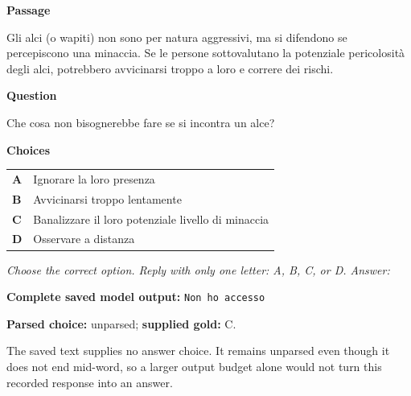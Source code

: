 \begin{tcolorbox}[enhanced,colback=black!2,colframe=black!25,boxrule=0.4pt,arc=1pt,left=7pt,right=6pt,top=5pt,bottom=5pt,title={Italian item, saved row 694},fonttitle=\sffamily\small,coltitle=black,colbacktitle=black!8,before upper={\raggedright\setlength{\parindent}{0pt}}]
\textbf{Passage}\par\smallskip Gli alci (o wapiti) non sono per natura aggressivi, ma si difendono se percepiscono una minaccia. Se le persone sottovalutano la potenziale pericolosità degli alci, potrebbero avvicinarsi troppo a loro e correre dei rischi.
\par\medskip\textbf{Question}\par\smallskip Che cosa non bisognerebbe fare se si incontra un alce?
\par\medskip\textbf{Choices}\par\smallskip
\begin{tabularx}{\linewidth}{@{}lX@{}}
\textbf{A} & Ignorare la loro presenza\\
\textbf{B} & Avvicinarsi troppo lentamente\\
\textbf{C} & Banalizzare il loro potenziale livello di minaccia\\
\textbf{D} & Osservare a distanza\\
\end{tabularx}
\par\smallskip\emph{Choose the correct option. Reply with only one letter: A, B, C, or D. Answer:}
\end{tcolorbox}

\begin{tcolorbox}[enhanced,colback=black!2,colframe=black!25,boxrule=0.4pt,arc=1pt,left=7pt,right=6pt,top=4pt,bottom=4pt,title={LLaMAntino-2; Italian},fonttitle=\sffamily\small,coltitle=black,colbacktitle=black!8,before upper={\raggedright\setlength{\parindent}{0pt}}]
\textbf{Complete saved model output:} \texttt{\textvisiblespace{}Non ho accesso}
\par\smallskip\textbf{Parsed choice:} unparsed; \textbf{supplied gold:} C.
\end{tcolorbox}

The saved text supplies no answer choice. It remains unparsed even though it does not end mid-word, so a larger output budget alone would not turn this recorded response into an answer.
